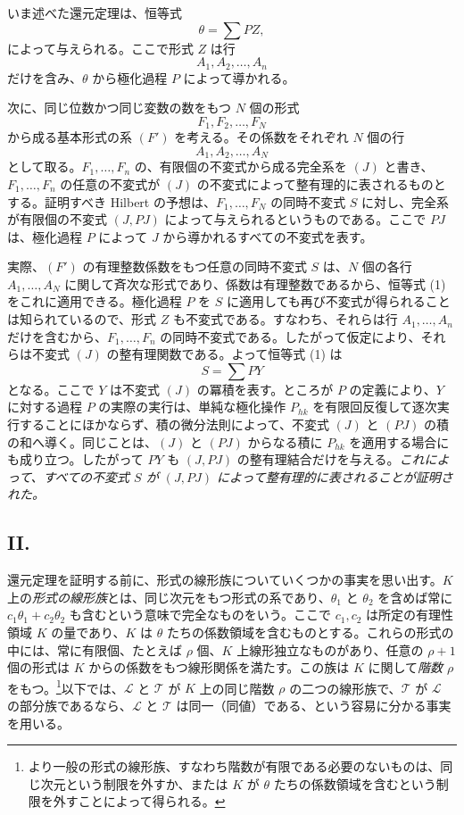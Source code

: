 いま述べた還元定理は、恒等式
\begin{equation}
  \theta=\sum PZ,
\tag{1}
\end{equation}
によって与えられる。ここで形式 $Z$ は行
\[
  A_1,A_2,\ldots,A_n
\]
だけを含み、$\theta$ から極化過程 $P$ によって導かれる。

次に、同じ位数かつ同じ変数の数をもつ $N$ 個の形式
\[
  F_1,F_2,\ldots,F_N
\]
から成る基本形式の系 $(F')$ を考える。その係数をそれぞれ $N$ 個の行
\[
  A_1,A_2,\ldots,A_N
\]
として取る。$F_1,
\ldots,F_n$ の、有限個の不変式から成る完全系を $(J)$ と書き、$F_1,
\ldots,F_n$ の任意の不変式が $(J)$ の不変式によって整有理的に表されるものとする。証明すべき Hilbert の予想は、$F_1,
\ldots,F_N$ の同時不変式 $S$ に対し、完全系が有限個の不変式 $(J,PJ)$ によって与えられるというものである。ここで $PJ$ は、極化過程 $P$ によって $J$ から導かれるすべての不変式を表す。

実際、$(F')$ の有理整数係数をもつ任意の同時不変式 $S$ は、$N$ 個の各行 $A_1,
\ldots,A_N$ に関して斉次な形式であり、係数は有理整数であるから、恒等式 (1) をこれに適用できる。極化過程 $P$ を $S$ に適用しても再び不変式が得られることは知られているので、形式 $Z$ も不変式である。すなわち、それらは行 $A_1,
\ldots,A_n$ だけを含むから、$F_1,
\ldots,F_n$ の同時不変式である。したがって仮定により、それらは不変式 $(J)$ の整有理関数である。よって恒等式 (1) は
\[
  S=\sum PY
\]
となる。ここで $Y$ は不変式 $(J)$ の冪積を表す。ところが $P$ の定義により、$Y$ に対する過程 $P$ の実際の実行は、単純な極化操作 $P_{hk}$ を有限回反復して逐次実行することにほかならず、積の微分法則によって、不変式 $(J)$ と $(PJ)$ の積の和へ導く。同じことは、$(J)$ と $(PJ)$ からなる積に $P_{hk}$ を適用する場合にも成り立つ。したがって $PY$ も $(J,PJ)$ の整有理結合だけを与える。\emph{これによって、すべての不変式 $S$ が $(J,PJ)$ によって整有理的に表されることが証明された。}

\subsection*{II.}
還元定理を証明する前に、形式の線形族についていくつかの事実を思い出す。$K$ 上の\emph{形式の線形族}とは、同じ次元をもつ形式の系であり、$\theta_1$ と $\theta_2$ を含めば常に $c_1\theta_1+c_2\theta_2$ も含むという意味で完全なものをいう。ここで $c_1,c_2$ は所定の有理性領域 $K$ の量であり、$K$ は $\theta$ たちの係数領域を含むものとする。これらの形式の中には、常に有限個、たとえば $\rho$ 個、$K$ 上線形独立なものがあり、任意の $\rho+1$ 個の形式は $K$ からの係数をもつ線形関係を満たす。この族は $K$ に関して\emph{階数 $\rho$} をもつ。\footnote{より一般の形式の線形族、すなわち階数が有限である必要のないものは、同じ次元という制限を外すか、または $K$ が $\theta$ たちの係数領域を含むという制限を外すことによって得られる。}以下では、$\mathcal L$ と $\mathcal T$ が $K$ 上の同じ階数 $\rho$ の二つの線形族で、$\mathcal T$ が $\mathcal L$ の部分族であるなら、$\mathcal L$ と $\mathcal T$ は同一（同値）である、という容易に分かる事実を用いる。

